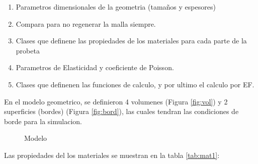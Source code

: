 \documentclass[12pt, a4paper]{article}
\begin{document}
\begin{enumerate}
	\item Parametros dimensionales de la geometria (tamaños y espesores)
	\item Compara para no regenerar la malla siempre.
	\item Clases que definene las propiedades de los materiales para cada parte de la probeta
	\item Parametros de Elasticidad y coeficiente de Poisson.
	\item Clases que definenen las funciones de calculo, y por ultimo el calculo por EF. 
\end{enumerate}


En el modelo geometrico, se definieron 4 volumenes (Figura \ref{fig:vol}) y 2 superficies (bordes) (Figura \ref{fig:bord}), las cuales tendran las condiciones de borde para la simulacion.

\begin{figure}[h]
	\centering
	\caption{Modelo} \label{fig:modelo1}
\end{figure}

Las propiedades del los materiales se muestran en la tabla \ref{tab:mat1}:

\begin{table}[]
	\centering
	\caption{Propiedades de los materiales}
	\label{tab:mat1}
\end{table}
\end{document}
